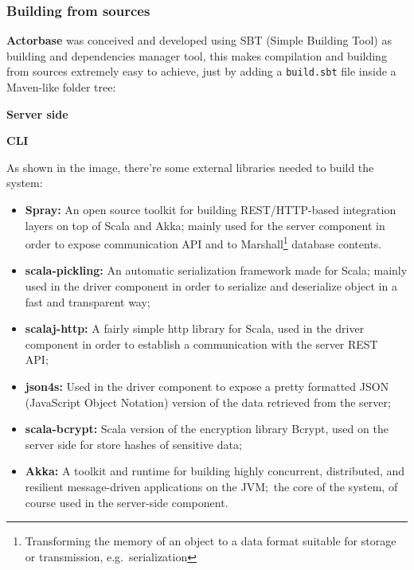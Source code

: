 \documentclass{scalatekids-article}
\begin{document}
\subsubsection{Building from sources}

\textbf{Actorbase} was conceived and developed using SBT (Simple Building Tool) as building and dependencies
manager tool, this makes compilation and building from sources extremely easy to achieve, just by adding a
\verb=build.sbt= file inside a Maven-like folder tree:

\textbf{Server side}


\textbf{CLI}


As shown in the image, there're some external libraries needed to build the system:
\begin{itemize}
\item \textbf{Spray:} An open source toolkit for building REST/HTTP-based
  integration layers on top of Scala and Akka; mainly used for the server
  component in order to expose communication API and to
  Marshall\footnote{Transforming the memory of an object to a data format suitable
    for storage or transmission, e.g.\ serialization} database contents.
\item \textbf{scala-pickling:} An automatic serialization framework made for
  Scala; mainly used in the driver component in order to serialize and
  deserialize object in a fast and transparent way;
\item \textbf{scalaj-http:} A fairly simple http library for Scala, used in the
  driver component in order to establish a communication with the server REST API;\
\item \textbf{json4s:} Used in the driver component to expose a pretty formatted
  JSON (JavaScript Object Notation) version of the data retrieved from the server;
\item \textbf{scala-bcrypt:} Scala version of the encryption library Bcrypt,
  used on the server side for store hashes of sensitive data;
\item \textbf{Akka:} A toolkit and runtime for building highly concurrent,
  distributed, and resilient message-driven applications on the JVM;\ the core of
  the system, of course used in the server-side component.
\end{itemize}
\end{document}
